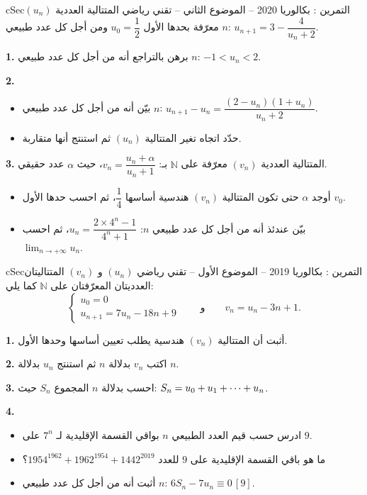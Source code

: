 \documentclass[12pt,a4paper]{article}
\newenvironment{BOX}[2]{\begin{otherlanguage}{english}\begin{arbox}{#1}{#2}}{\end{arbox}\end{otherlanguage}}
\newcounter{exo}
\newenvironment{tamrin}[1]{\stepcounter{exo}\begin{BOX}{cSec}{التمرين \theexo: #1}}{\end{BOX}}
\renewcommand{\cdots}{\mathinner{\cdotp\cdotp\cdotp}}
\newcommand{\N}{\mathbb{N}}
\newcommand{\limn}{\displaystyle\lim_{n\to+\infty}}
\newenvironment{sq}{\begin{itemize}[leftmargin=2.4em,itemsep=3pt]}{\end{itemize}}
\newcommand{\qa}{\item[(أ)]}\newcommand{\qb}{\item[(ب)]}\newcommand{\qc}{\item[(جـ)]}\newcommand{\qd}{\item[(د)]}\newcommand{\qe}{\item[(هـ)]}
\newcommand{\QQ}[1]{\par\smallskip\textbf{#1.} }
\begin{document}
\begin{tamrin}{بكالوريا 2020 -- الموضوع الثاني -- تقني رياضي}
المتتالية العددية $(u_n)$ معرّفة بحدها الأول $u_0=\dfrac12$ ومن أجل كل عدد طبيعي $n$: $u_{n+1}=3-\dfrac{4}{u_n+2}$.

\QQ{1} برهن بالتراجع أنه من أجل كل عدد طبيعي $n$: $-1<u_n<2$.

\QQ{2}
\begin{sq}
\qa بيّن أنه من أجل كل عدد طبيعي $n$: $u_{n+1}-u_n=\dfrac{(2-u_n)(1+u_n)}{u_n+2}$.
\qb حدّد اتجاه تغير المتتالية $(u_n)$ ثم استنتج أنها متقاربة.
\end{sq}

\QQ{3} المتتالية العددية $(v_n)$ معرّفة على $\N$ بـ: $v_n=\dfrac{u_n+\alpha}{u_n+1}$، حيث $\alpha$ عدد حقيقي.
\begin{sq}
\qa أوجد $\alpha$ حتى تكون المتتالية $(v_n)$ هندسية أساسها $\dfrac14$، ثم احسب حدها الأول $v_0$.
\qb بيّن عندئذ أنه من أجل كل عدد طبيعي $n$: $u_n=\dfrac{2\times4^n-1}{4^n+1}$، ثم احسب $\limn u_n$.
\end{sq}
\end{tamrin}

\begin{tamrin}{بكالوريا 2019 -- الموضوع الأول -- تقني رياضي}
$(u_n)$ و $(v_n)$ المتتاليتان العدديتان المعرّفتان على $\N$ كما يلي:
\[\begin{cases}u_0=0\\ u_{n+1}=7u_n-18n+9\end{cases}\qquad\text{و}\qquad v_n=u_n-3n+1.\]

\QQ{1} أثبت أن المتتالية $(v_n)$ هندسية يطلب تعيين أساسها وحدها الأول.

\QQ{2} اكتب $v_n$ بدلالة $n$ ثم استنتج $u_n$ بدلالة $n$.

\QQ{3} احسب بدلالة $n$ المجموع $S_n$ حيث: $S_n=u_0+u_1+\cdots+u_n$.

\QQ{4}
\begin{sq}
\qa ادرس حسب قيم العدد الطبيعي $n$ بواقي القسمة الإقليدية لـ $7^n$ على $9$.
\qb ما هو باقي القسمة الإقليدية على $9$ للعدد $1954^{1962}+1962^{1954}+1442^{2019}$؟
\qc أثبت أنه من أجل كل عدد طبيعي $n$: $6S_n-7u_n\equiv0\,[9]$.
\end{sq}
\end{tamrin}
\end{document}
